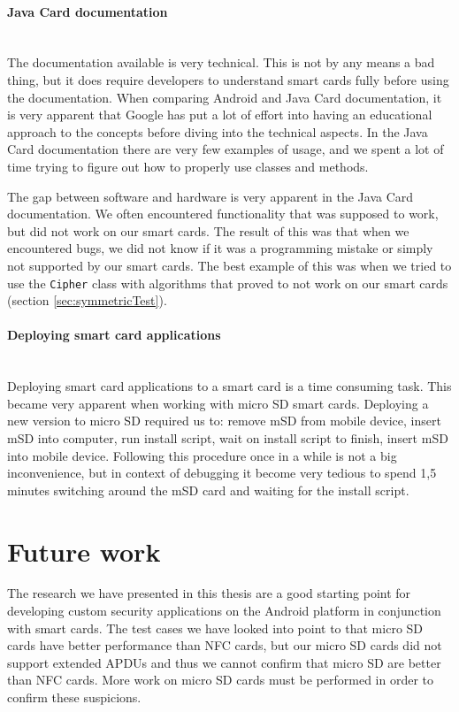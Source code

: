 \paragraph{Java Card documentation}\mbox{}\\
The documentation available is very technical. This is not by any means a bad thing, but it does require developers to understand smart cards fully before using the documentation. When comparing Android and Java Card documentation, it is very apparent that Google has put a lot of effort into having an educational approach to the concepts before diving into the technical aspects. In the Java Card documentation there are very few examples of usage, and we spent a lot of time trying to figure out how to properly use classes and methods.

The gap between software and hardware is very apparent in the Java Card documentation. We often encountered functionality that was supposed to work, but did not work on our smart cards. The result of this was that when we encountered bugs, we did not know if it was a programming mistake or simply not supported by our smart cards. The best example of this was when we tried to use the \texttt{Cipher} class with algorithms that proved to not work on our smart cards (section \ref{sec:symmetricTest}).

\paragraph{Deploying smart card applications}\mbox{}\\
Deploying smart card applications to a smart card is a time consuming task. This became very apparent when working with micro SD smart cards. Deploying a new version to micro SD required us to: remove mSD from mobile device, insert mSD into computer, run install script, wait on install script to finish, insert mSD into mobile device. Following this procedure once in a while is not a big inconvenience, but in context of debugging it become very tedious to spend 1,5 minutes switching around the mSD card and waiting for the install script.

\section{Future work}
\label{sec:future}
The research we have presented in this thesis are a good starting point for developing custom security applications on the Android platform in conjunction with smart cards. The test cases we have looked into point to that micro SD cards have better performance than NFC cards, but our micro SD cards did not support extended APDUs and thus we cannot confirm that micro SD are better than NFC cards. More work on micro SD cards must be performed in order to confirm these suspicions.


